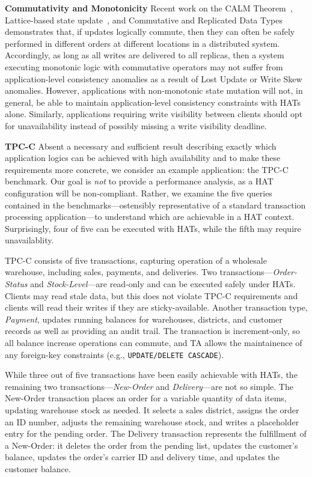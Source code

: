 \vspace{.5em}\noindent\textbf{Commutativity and Monotonicity} Recent
work on the CALM Theorem~\cite{calm}, Lattice-based state
update~\cite{blooml}, and Commutative and Replicated Data
Types~\cite{crdt} demonstrates that, if updates logically commute,
then they can often be safely performed in different orders at
different locations in a distributed system. Accordingly, as long as
all writes are delivered to all replicas, then a system executing
monotonic logic with commutative operators may not suffer from
application-level consistency anomalies as a result of Lost Update or
Write Skew anomalies. However, applications with non-monotonic state
mutation will not, in general, be able to maintain application-level
consistency constraints with HATs alone. Similarly, applications
requiring write visibility between clients should opt for
unavailability instead of possibly missing a write visibility
deadline.

\vspace{.5em}\noindent\textbf{TPC-C} Absent a necessary and sufficient
result describing exactly which application logics can be achieved
with high availability and to make these requirements more concrete,
we consider an example application: the TPC-C benchmark. Our goal is
\textit{not} to provide a performance analysis, as a HAT
configuration will be non-compliant. Rather, we examine the five
queries contained in the benchmarks---ostensibly representative of a
standard transaction processing application---to understand which are
achievable in a HAT context. Surprisingly, four of five can be
executed with HATs, while the fifth may require unavailablity.

TPC-C consists of five transactions, capturing operation of a
wholesale warehouse, including sales, payments, and deliveries. Two
transactions---\textit{Order-Status} and \textit{Stock-Level}---are
read-only and can be executed safely under HATs. Clients may read
stale data, but this does not violate TPC-C requirements and clients
will read their writes if they are sticky-available. Another
transaction type, \textit{Payment}, updates running balances for
warehouses, districts, and customer records as well as providing an
audit trail. The transaction is increment-only, so all balance
increase operations can commute, and TA allows the maintainence of any
foreign-key constraints (e.g., \texttt{UPDATE/DELETE CASCADE}).

While three out of five transactions have been easily achievable with
HATs, the remaining two transactions---\textit{New-Order} and
\textit{Delivery}---are not so simple. The New-Order transaction
places an order for a variable quantity of data items, updating
warehouse stock as needed. It selects a sales district, assigns the
order an ID number, adjusts the remaining warehouse stock, and writes
a placeholder entry for the pending order. The Delivery transaction
represents the fulfillment of a New-Order: it deletes the order from
the pending list, updates the customer's balance, updates the order's
carrier ID and delivery time, and updates the customer balance.

